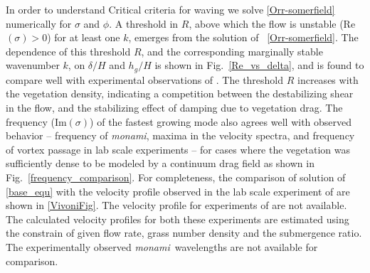\documentclass[12pt]{report}   %
\newcommand{\hg}{h_g}
\newcommand{\Rey}{{R}}
\newcommand{\monami}{\textit{monami}}
\begin{document}
In order to understand Critical criteria for waving we solve \eqref{Orr-somerfield} numerically for $\sigma$ and $\phi$. A threshold in $\Rey$, above which the flow is unstable (Re$(\sigma)>0$) for at least one $k$, emerges from the solution of ~\eqref{Orr-somerfield}. 
The dependence of this threshold $\Rey$, and the corresponding marginally stable wavenumber $k$, on $\delta/H$ and $\hg/H$ is shown in Fig.~\ref{Re_vs_delta}, and is found to compare well with experimental observations of \cite{Ghisal02}.
The threshold $\Rey$ increases with the vegetation density, indicating a competition between the destabilizing shear in the flow, and the stabilizing effect of damping due to vegetation drag.
The frequency (Im$(\sigma)$) of the fastest growing mode also agrees well with observed behavior -- frequency of \monami, maxima in the velocity spectra, and frequency of vortex passage in lab scale experiments \cite{Ghisal02} -- for cases where the vegetation was sufficiently dense to be modeled by a continuum drag field as shown in Fig.~\ref{frequency_comparison}. For completeness, the comparison of solution of \eqref{base_equ}
with the velocity profile observed in the lab scale experiment of \cite{Vivoni98} are shown in \ref{VivoniFig}. The velocity profile for experiments of \cite{Ghisal02} are not
available. The calculated velocity profiles for both these experiments are estimated using the constrain of given flow rate, grass number density and the submergence ratio. The experimentally observed \monami ~wavelengths are not available for comparison.
\end{document}
